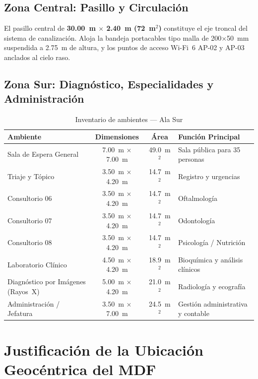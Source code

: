 \subsection{Zona Central: Pasillo y Circulación}

El pasillo central de \textbf{30.00~m $\times$ 2.40~m (72~m$^2$)} constituye el eje troncal del sistema de canalización. Aloja la bandeja portacables tipo malla de 200$\times$50~mm suspendida a 2.75~m de altura, y los puntos de acceso Wi-Fi~6 AP-02 y AP-03 anclados al cielo raso.

\subsection{Zona Sur: Diagnóstico, Especialidades y Administración}

\begin{table}[H]
\centering
\caption{Inventario de ambientes — Ala Sur}
\begin{tabularx}{\textwidth}{@{} >{\raggedright\arraybackslash}p{5.5cm} c c X @{}}
\toprule
\textbf{Ambiente} & \textbf{Dimensiones} & \textbf{Área} & \textbf{Función Principal} \\
\midrule
Sala de Espera General & 7.00~m $\times$ 7.00~m & 49.0~m$^2$ & Sala pública para 35 personas \\
Triaje y Tópico & 3.50~m $\times$ 4.20~m & 14.7~m$^2$ & Registro y urgencias \\
Consultorio 06 & 3.50~m $\times$ 4.20~m & 14.7~m$^2$ & Oftalmología \\
Consultorio 07 & 3.50~m $\times$ 4.20~m & 14.7~m$^2$ & Odontología \\
Consultorio 08 & 3.50~m $\times$ 4.20~m & 14.7~m$^2$ & Psicología / Nutrición \\
Laboratorio Clínico & 4.50~m $\times$ 4.20~m & 18.9~m$^2$ & Bioquímica y análisis clínicos \\
Diagnóstico por Imágenes (Rayos~X) & 5.00~m $\times$ 4.20~m & 21.0~m$^2$ & Radiología y ecografía \\
Administración / Jefatura & 3.50~m $\times$ 7.00~m & 24.5~m$^2$ & Gestión administrativa y contable \\
\bottomrule
\end{tabularx}
\label{tab:ambientes-sur}
\end{table}

\section{Justificación de la Ubicación Geocéntrica del MDF}

